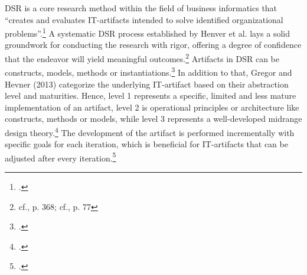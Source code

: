 \ac{DSR} is a core research method within the field of business informatics that ``creates and evaluates \ac{IT}-artifacts intended to solve identified organizational problems''.\footcite[77]{hevnerDesignScienceInformation2004a}
A systematic \ac{DSR} process established by Henver et al. lays a solid groundwork for conducting the research with rigor, offering a degree of confidence that the endeavor will yield meaningful outcomes.\footnote{cf.\cite{baskervilleDesignScienceResearch2018}, p. 368; cf.\cite{hevnerDesignScienceInformation2004a}, p. 77}
Artifacts in \ac{DSR} can be constructs, models, methods or instantiations.\footcite[77]{hevnerDesignScienceInformation2004a}
In addition to that, Gregor and Hevner (2013) categorize the underlying \ac{IT}-artifact based on their abstraction level and maturities.
Hence, level 1 represents a specific, limited and less mature implementation of an artifact, level 2 is operational principles or architecture like constructs, methods or models, while level 3 represents a well-developed midrange design theory.\footcite[cf.][342]{gregorPositioningPresentingDesign2013}
The development of the artifact is performed incrementally with specific goals for each iteration, which is beneficial for \ac{IT}-artifacts that can be adjusted after every iteration.\footcite[cf.][343]{gregorPositioningPresentingDesign2013}

